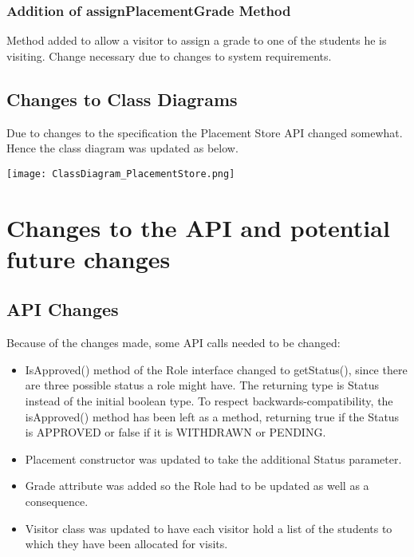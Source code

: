\documentclass{l3deliverable}
\begin{document}
\subsubsection{Addition of assignPlacementGrade Method}
Method added to allow a visitor to assign a grade to one of the students he is visiting. Change necessary due to changes to system requirements.

\subsection{Changes to Class Diagrams}
Due to changes to the specification the Placement Store API changed somewhat. Hence the class diagram was updated as below.

\texttt{[image: ClassDiagram\_PlacementStore.png]}\\


\section{Changes to the API and potential future changes}

\subsection{API Changes}
Because of the changes made, some API calls needed to be changed:
\begin{itemize}
\item IsApproved() method of the Role interface changed to getStatus(), since there are three possible status a role might have. The returning type is Status instead of the initial boolean type. To respect backwards-compatibility, the isApproved() method has been left as a method, returning true if the Status is APPROVED or false if it is WITHDRAWN or PENDING.
\item Placement constructor was updated to take the additional Status parameter.
\item Grade attribute was added so the Role had to be updated as well as a consequence.
\item Visitor class was updated to have each visitor hold a list of the students to which they have been allocated for visits.
\end{itemize}
\end{document}
